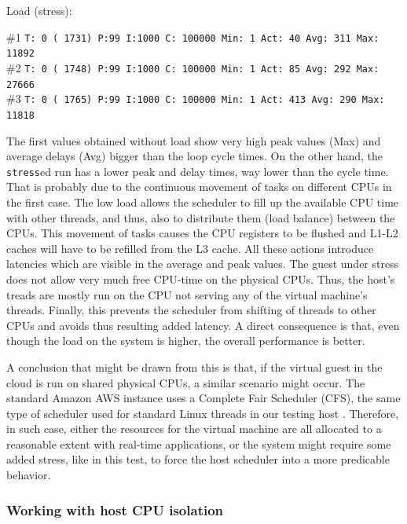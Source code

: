 \documentclass[]{scrartcl}
\begin{document}
\noindent Load (stress):

\noindent \small \#1 \texttt{T: 0 ( 1731) P:99 I:1000 C: 100000 Min: 1 Act:   40 Avg:  311 Max:   11892}\\
\noindent \small \#2 \texttt{T: 0 ( 1748) P:99 I:1000 C: 100000 Min: 1 Act:   85 Avg:  292 Max:   27666}\\
\noindent \small \#3 \texttt{T: 0 ( 1765) P:99 I:1000 C: 100000 Min: 1 Act:  413 Avg:  290 Max:   11818}

\bigskip

The first values obtained without load show very high peak values (Max) and average delays (Avg) bigger than the loop cycle times. On the other hand, the \texttt{stress}ed run has a lower peak and delay times, way lower than the cycle time. That is probably due to the continuous movement of tasks on different CPUs in the first case. 
The low load allows the scheduler to fill up the available CPU time with other threads, and thus, also to distribute them (load balance) between the CPUs.
This movement of tasks causes the CPU registers to be flushed and L1-L2 caches will have to be refilled from the L3 cache. 
All these actions introduce latencies which are visible in the average and peak values.
The guest under stress does not allow very much free CPU-time on the physical CPUs. Thus, the host's treads are mostly run on the CPU not serving any of the virtual machine's threads. 
Finally, this prevents the scheduler from shifting of threads to other CPUs and avoids thus resulting added latency. A direct consequence is that, even though the load on the system is higher, the overall performance is better. 

A conclusion that might be drawn from this is that, if the virtual guest in the cloud is run on shared physical CPUs, a similar scenario might occur. 
The standard Amazon AWS instance uses a Complete Fair Scheduler (CFS), the same type of scheduler used for standard Linux threads in our testing host \cite{xen01}.
Therefore, in such case, either the resources for the virtual machine are all allocated to a reasonable extent with real-time applications, or the system might require some added stress, like in this test, to force the host scheduler into a more predicable behavior. 

\subsubsection{Working with host CPU isolation}
\end{document}
